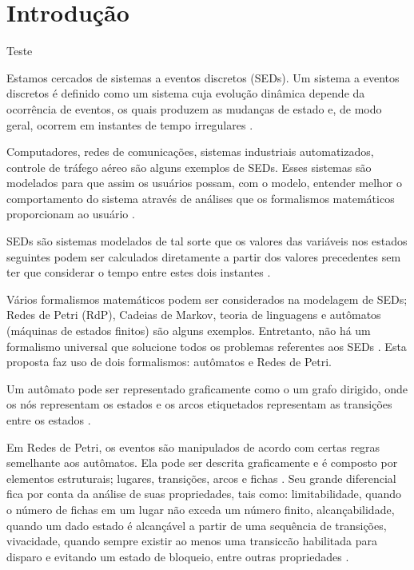 \chapter{Introdu\c{c}\~ao}


Teste


Estamos cercados de sistemas a eventos discretos (SEDs). Um sistema a eventos discretos \'e definido como um sistema cuja evolu\c{c}\~ao din\^amica depende da ocorr\^encia de eventos, os quais produzem as mudan\c{c}as de estado e, de modo geral, ocorrem em instantes de tempo irregulares \cite{Montgomery2004}. 

Computadores, redes de comunica\c{c}\~oes, sistemas industriais automatizados, controle de tr\'afego a\'ereo s\~ao alguns exemplos de SEDs. Esses sistemas s\~ao modelados para que assim os usu\'arios possam, com o modelo, entender melhor o comportamento do sistema atrav\'es de an\'alises que os formalismos matem\'aticos proporcionam ao usu\'ario \cite{Wolfgang2013}.

SEDs s\~ao sistemas modelados de tal sorte que os valores das vari\'aveis nos estados seguintes podem ser calculados diretamente a partir dos valores precedentes sem ter que considerar o tempo entre estes dois instantes \cite{Janette}.

V\'arios formalismos matem\'aticos podem ser considerados na modelagem de SEDs; Redes de Petri (RdP), Cadeias de Markov, teoria de linguagens e aut\^omatos (m\'aquinas de estados finitos) s\~ao alguns exemplos. Entretanto, n\~ao h\'a um formalismo universal que solucione todos os problemas referentes aos SEDs \cite{Montgomery2004}. Esta proposta faz uso de dois formalismos: aut\^omatos e Redes de Petri.


Um aut\^omato pode ser representado graficamente como o um grafo dirigido, onde os n\'os representam os estados e os arcos etiquetados representam as transi\c{c}\~oes entre os estados \cite{apostilacury}.

Em Redes de Petri, os eventos s\~ao manipulados de acordo com certas regras semelhante aos aut\^omatos. Ela pode ser descrita graficamente e \'e composto por elementos estruturais; lugares, transi\c{c}\~oes, arcos e fichas \cite{Cassandras2008}. Seu grande diferencial fica por conta da an\'alise de suas propriedades, tais como: limitabilidade, quando o n\'umero de fichas em um lugar n\~ao exceda um n\'umero finito, alcan\c{c}abilidade, quando um dado estado \'e alcan\c{c}\'avel a partir de uma sequ\^encia de transi\c{c}\~oes, vivacidade, quando sempre existir ao menos uma transic{c}\~ao habilitada para disparo e evitando um estado de bloqueio, entre outras propriedades \cite{Cassandras2008}.

